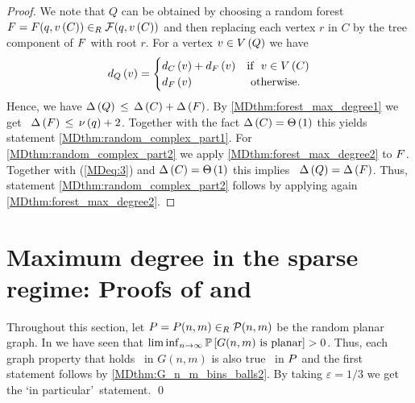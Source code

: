 \begin{proof}
We note that $Q$ can be obtained by choosing a random forest $\forest=\forest(q,\numberVertices{C})\ur\forestclass(q,\numberVertices{C})$ and then replacing each vertex $r$ in $C$ by the tree component of $\forest$ with root $r$. For a vertex $v\in \vertexSet{Q}$ we have
\begin{align}\label{MDeq:3}
	\degree{v}{Q}=
	\begin{cases}
		\degree{v}{C}+\degree{v}{F}& \text{if}~~ v \in \vertexSet{C} \\
		\degree{v}{F} & \text{ otherwise}.
	\end{cases}
\end{align}
Hence, we have $\maxdegree{Q}\lessorequal \maxdegree{C}+\maxdegree{\forest}$. By \ref{MDthm:forest_max_degree1} we get \whp\ $\maxdegree{\forest}\lessorequal \specialconcentration{q}+2$. Together with the fact $\maxdegree{C}=\Th{1}$ this yields statement \ref{MDthm:random_complex_part1}. For \ref{MDthm:random_complex_part2} we apply \ref{MDthm:forest_max_degree2} to $\forest$. Together with (\ref{MDeq:3}) and $\maxdegree{C}=\Th{1}$ this implies \whp\ $\maxdegree{Q}=\maxdegree{\forest}$. Thus, statement \ref{MDthm:random_complex_part2} follows by applying again \ref{MDthm:forest_max_degree2}.
\end{proof}

\section[Maximum degree in the sparse regime]{Maximum degree in the sparse regime: Proofs of  and }\label{MDsec:proof}
Throughout this section, let $\planargraph=\planargraph(n,m)\ur \planarclass(n,m)$ be the random planar graph.
In  we have seen that $\liminf_{n \to \infty} \prob{G(n,m)\text{ is planar}}>0$. Thus, each graph property that holds \whp\ in $G(n,m)$ is also true \whp\ in $\planargraph$ and the first statement follows by \ref{MDthm:G_n_m_bins_balls2}. By taking $\varepsilon=1/3$ we get the \lq in particular\rq\ statement. \qed


